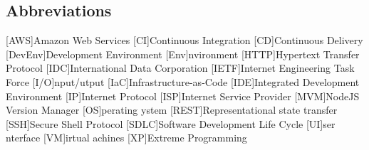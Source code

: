 \newcommand{\abbr}{Abbreviations}
\subsection{Abbreviations}

\begin{acronym}[1234567890]		%
\setlength{\itemsep}{-\parsep}	%
[AWS]{Amazon Web Services}
[CI]{Continuous Integration}
[CD]{Continuous Delivery}
[DevEnv]{Development Environment}
[Env]{nvironment}
[HTTP]{Hypertext Transfer Protocol}
[IDC]{International Data Corporation}
[IETF]{Internet Engineering Task Force}
[I/O]{nput/utput}
[IaC]{Infrastructure-as-Code}
[IDE]{Integrated Development Environment }
[IP]{Internet Protocol}
[ISP]{Internet Service Provider}
[MVM]{NodeJS Version Manager}
[OS]{perating ystem}
[REST]{Representational state transfer}
[SSH]{Secure Shell Protocol}
[SDLC]{Software Development Life Cycle}
[UI]{ser nterface}
[VM]{irtual achines}
[XP]{Extreme Programming}
\end{acronym}